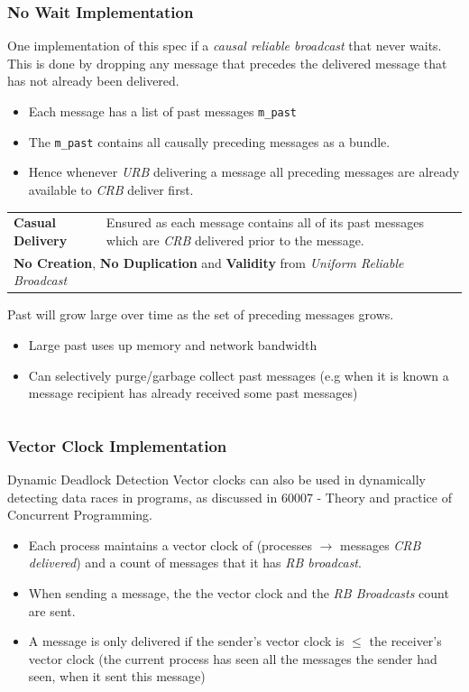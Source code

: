 \subsubsection{No Wait Implementation}
One implementation of this spec if a \textit{causal reliable broadcast} that never waits. This is done by dropping any message that precedes the delivered message that has not already been delivered.
\begin{itemize}
    \item Each message has a list of past messages \texttt{m_past}
    \item The \texttt{m_past} contains all causally preceding messages as a bundle.
    \item Hence whenever \textit{URB} delivering a message all preceding messages are already available to \textit{CRB} deliver first.
\end{itemize}
\begin{center}
    \begin{tabular}{l p{}}
        \textbf{Casual Delivery} & Ensured as each message contains all of its past messages which are \textit{CRB} delivered prior to the message. \\
        \multicolumn{2}{l}{\textbf{No Creation}, \textbf{No Duplication} and \textbf{Validity} from \textit{Uniform Reliable Broadcast}} \\
    \end{tabular}
\end{center}
Past will grow large over time as the set of preceding messages grows.
\begin{itemize}
    \item Large past uses up memory and network bandwidth
    \item Can selectively purge/garbage collect past messages (e.g when it is known a message recipient has already received some past messages)
\end{itemize}
\inputminted{elixir}{broadcast/code/causal_reliable_broadcast_no_wait.ex}

\subsubsection{Vector Clock Implementation}
\begin{sidenotebox}{Dynamic Deadlock Detection}
    Vector clocks can also be used in dynamically detecting data races in programs, as discussed in 60007 - Theory and practice of Concurrent Programming.
\end{sidenotebox}
\begin{itemize}
    \item Each process maintains a vector clock of (processes $\to$ messages \textit{CRB delivered}) and a count of messages that it has \textit{RB broadcast}.
    \item When sending a message, the  the vector clock and the \textit{RB Broadcasts} count are sent.
    \item A message is only delivered if the sender's vector clock is $\leq$ the receiver's vector clock (the current process has seen all the messages the sender had seen, when it sent this message)
\end{itemize}

